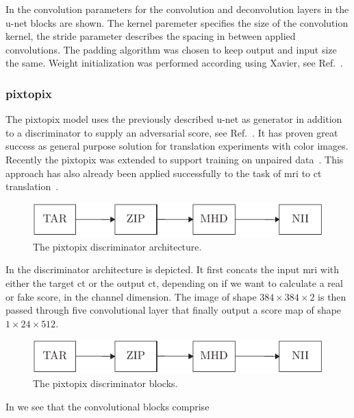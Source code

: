 In  the convolution parameters for the convolution and
deconvolution layers in the u-net blocks are shown. The kernel paremeter
specifies the size of the convolution kernel, the stride parameter describes
the spacing in between applied convolutions. The padding algorithm was chosen
to keep output and input size the same. Weight initialization was performed
according using Xavier, see Ref.~\cite{Xavier2010}.

\subsubsection{pixtopix}

The pixtopix model uses the previously described u-net as generator in
addition to a discriminator to supply an adversarial score, see
Ref.~\cite{Isola16}. It has proven great success as general purpose solution
for translation experiments with color images. Recently the pixtopix was
extended to support training on unpaired data~\cite{Zhu2017}. This approach
has also already been applied successfully to the task of \gls{mri} to
\gls{ct} translation~\cite{Wolterink17}.
\begin{figure}[h]
  \centering
  \includegraphics[page=5,width=\linewidth]{figure/diagrams.pdf}
  \caption{The pixtopix discriminator architecture.
	}\label{fig:pixtopix:disc}
\end{figure}
In  the discriminator architecture is depicted. It
first concats the input \gls{mri} with either the target \gls{ct} or the
output \gls{ct}, depending on if we want to calculate a real or fake score,
in the channel dimension. The image of shape $384\times384\times2$ is then
passed through five convolutional layer that finally output a score map of
shape $1\times24\times512$.
\begin{figure}[h]
  \centering
  \includegraphics[page=6,width=\linewidth]{figure/diagrams.pdf}
  \caption{The pixtopix discriminator blocks.
	}\label{fig:pixtopix:blocks}
\end{figure}
In  we see that the convolutional blocks comprise
